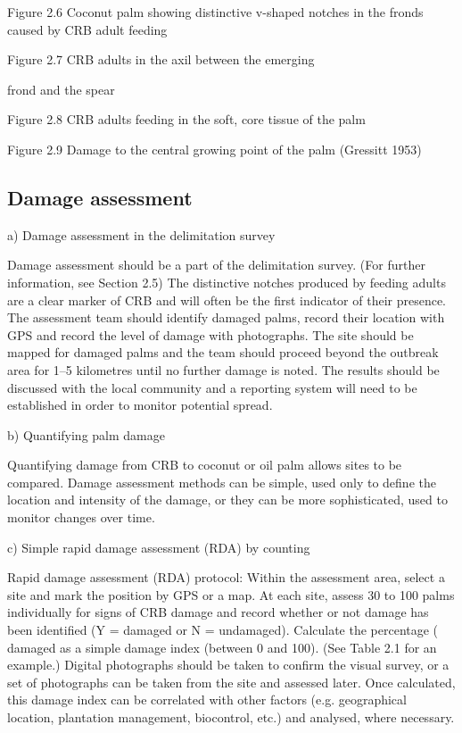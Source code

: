 \documentclass[twocolumn,letterpaper]{scrartcl}
\begin{document}
Figure 2.6  Coconut palm showing  
distinctive v-shaped notches in the  
fronds caused by CRB adult feeding

Figure 2.7  CRB adults in the  
axil between the emerging  

frond and the spear

Figure 2.8  CRB adults feeding in  
the soft, core tissue of the palm

Figure 2.9  Damage to the central growing point of the palm (Gressitt 1953)

\subsection{Damage assessment}

a)  Damage assessment in the delimitation survey

Damage assessment should be a part of the delimitation survey. (For further information, see Section 2.5) The 
distinctive notches produced by feeding adults are a clear marker of CRB and will often be the first indicator of 
their presence. The assessment team should identify damaged palms, record their location with GPS and record 
the level of damage with photographs. The site should be mapped for damaged palms and the team should 
proceed beyond the outbreak area for 1–5 kilometres until no further damage is noted. The results should be 
discussed with the local community and a reporting system will need to be established in order to monitor 
potential spread.

b)  Quantifying palm damage 

Quantifying damage from CRB to coconut or oil palm allows sites to be compared. Damage assessment methods 
can be simple, used only to define the location and intensity of the damage, or they can be more sophisticated, 
used to monitor changes over time. 

c)  Simple rapid damage assessment (RDA) by counting

Rapid damage assessment (RDA) protocol: Within the assessment area, select a site and mark the position by 
GPS or a map. At each site, assess 30 to 100 palms individually for signs of CRB damage and record whether 
or not damage has been identified (Y = damaged or N = undamaged). Calculate the percentage (%
damaged as a simple damage index (between 0 and 100). (See Table 2.1 for an example.) Digital photographs 
should be taken to confirm the visual survey, or a set of photographs can be taken from the site and assessed 
later.  Once  calculated,  this  damage  index  can  be  correlated  with  other  factors  (e.g.  geographical  location, 
plantation management, biocontrol, etc.) and analysed, where necessary.
\end{document}
